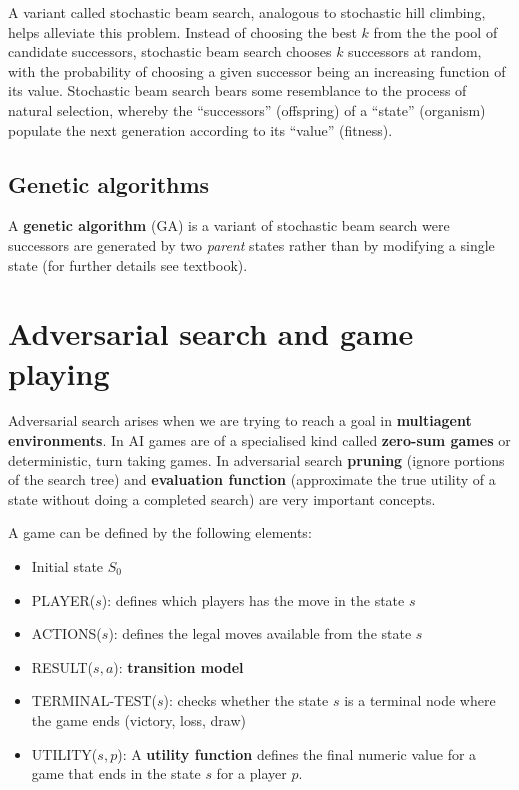 \documentclass[a4paper, 11pt]{article}
\begin{document}
A variant called stochastic beam search, analogous to stochastic hill climbing, helps alleviate this problem. Instead
of choosing the best $k$ from the the pool of candidate successors, stochastic beam search
chooses $k$ successors at random, with the probability of choosing a given successor being
an increasing function of its value. Stochastic beam search bears some resemblance to the
process of natural selection, whereby the “successors” (offspring) of a “state” (organism)
populate the next generation according to its “value” (fitness).

\subsection*{Genetic algorithms}
A \textbf{genetic algorithm} (GA) is a variant of stochastic beam search were successors are generated by two \emph{parent} states rather than by modifying a single state (for further details see textbook).

\section{Adversarial search and game playing}
Adversarial search arises when we are trying to reach a goal in \textbf{multiagent environments}. In AI games are of a specialised kind called \textbf{zero-sum games} or deterministic, turn taking games.
In adversarial search \textbf{pruning} (ignore portions of the search tree) and \textbf{evaluation function} (approximate the true utility of a state without doing a completed search) are very important concepts.

A game can be defined by the following elements:
\begin{itemize}
  \item Initial state $S_0$
  \item PLAYER($s$): defines which players has the move in the state $s$
  \item ACTIONS($s$): defines the legal moves available from the state $s$
  \item RESULT($s, a$): \textbf{transition model}
  \item TERMINAL-TEST($s$): checks whether the state $s$ is a terminal node where the game ends (victory, loss, draw)
  \item UTILITY($s, p$): A \textbf{utility function} defines the final numeric value for a game that ends in the state $s$ for a player $p$.
\end{itemize}
\end{document}
